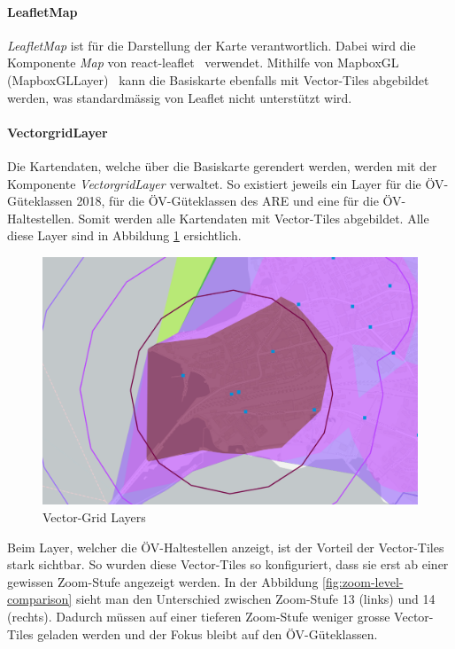 \paragraph{LeafletMap}
\emph{LeafletMap} ist für die Darstellung der Karte verantwortlich.
Dabei wird die Komponente \emph{Map} von react-leaflet~\cite{react-leaflet} verwendet.
Mithilfe von MapboxGL (MapboxGLLayer)~\cite{mapbox_gl_leaflet} kann die Basiskarte ebenfalls mit Vector-Tiles abgebildet werden, was standardmässig von Leaflet nicht unterstützt wird.

\paragraph{VectorgridLayer}
Die Kartendaten, welche über die Basiskarte gerendert werden, werden mit der Komponente \emph{VectorgridLayer} verwaltet.
So existiert jeweils ein Layer für die \acs{ÖV}-Güteklassen 2018, für die \acs{ÖV}-Güteklassen des \acl{ARE} und eine für die ÖV-Haltestellen.
Somit werden alle Kartendaten mit Vector-Tiles abgebildet.
Alle diese Layer sind in Abbildung \ref{fig:Vector-Grid-Layers} ersichtlich.

\begin{figure}[ht]
    \centering
    \includegraphics[width=0.6\linewidth]{projectdoc/img/vectorgrid_layers.png}
    \caption[Vector-Grid Layers]{Vector-Grid Layers}
    \label{fig:Vector-Grid-Layers}
\end{figure}

Beim Layer, welcher die ÖV-Haltestellen anzeigt, ist der Vorteil der Vector-Tiles stark sichtbar.
So wurden diese Vector-Tiles so konfiguriert, dass sie erst ab einer gewissen Zoom-Stufe angezeigt werden. In der Abbildung \ref{fig:zoom-level-comparison} sieht man den Unterschied zwischen Zoom-Stufe 13 (links) und 14 (rechts).
Dadurch müssen auf einer tieferen Zoom-Stufe weniger grosse Vector-Tiles geladen werden und der Fokus bleibt auf den \acs{ÖV}-Güteklassen.

